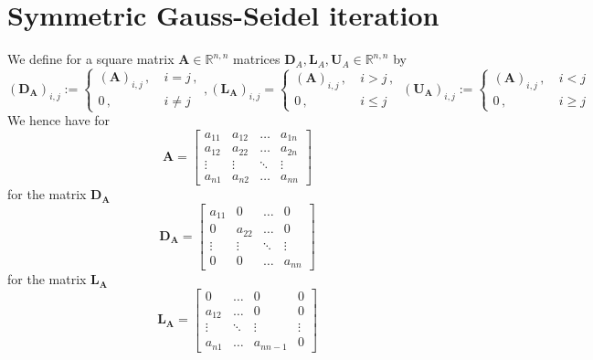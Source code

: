 \documentclass{article}
\begin{document}
\section*{Symmetric Gauss-Seidel iteration}
We define for a square matrix $\mathbf{A}\in \mathbb{R}^{n,n}$ matrices $\mathbf{D}_{A}, \mathbf{L}_{A}, \mathbf{U}_{A} \in \mathbb{R}^{n,n}$ by
\begin{equation*}
    \left(\mathbf{D}_{\mathbf{A}}\right)_{i,j} := \begin{cases}
    \left(\mathbf{A}\right)_{i,j}\,,\: &i = j\,, \\
    0\,, &i\neq j
    \end{cases}, \left(\mathbf{L}_{\mathbf{A}}\right)_{i,j} = \begin{cases} 
    \left(\mathbf{A}\right)_{i,j} \,,\: &i > j \,, \\
    0\,, & i\leq j
    \end{cases}\, \left(\mathbf{U}_{\mathbf{A}}\right)_{i,j} := \begin{cases}
        \left(\mathbf{A}\right)_{i,j}\,,\: &i < j \\
        0 \,, &i \geq j
    \end{cases}
\end{equation*}
We hence have for 
\begin{equation*}
    \mathbf{A} = \begin{bmatrix}
    a_{11} & a_{12} & \dots & a_{1n} \\
    a_{12} & a_{22} & \dots & a_{2n} \\
    \vdots & \vdots &  \ddots& \vdots \\
    a_{n1} & a_{n2} & \dots & a_{nn}
    \end{bmatrix}
\end{equation*}
for the matrix $\mathbf{D}_{\mathbf{A}}$
\begin{equation*}
\mathbf{D}_{\mathbf{A}} = 
    \begin{bmatrix}
        a_{11} & 0 & \dots & 0 \\
    0 & a_{22} & \dots & 0 \\
    \vdots & \vdots & \ddots & \vdots \\
   0& 0 & \dots & a_{nn}
    \end{bmatrix}
\end{equation*}
for the matrix $\mathbf{L}_{\mathbf{A}}$
\begin{equation*}
\mathbf{L}_{\mathbf{A}} =
    \begin{bmatrix}
        0 & \dots & 0 & 0 \\
    a_{12} & \dots & 0 & 0 \\
     \vdots & \ddots & \vdots & \vdots \\
    a_{n1} & \dots & a_{nn-1} &0
    \end{bmatrix}
\end{equation*}
\end{document}
